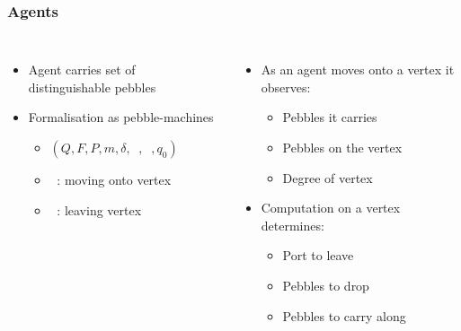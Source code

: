 \documentclass{beamer}
\DeclareMathOperator{\din}{\delta_{\mathit{in}}}
\DeclareMathOperator{\dout}{\delta_{\mathit{out}}}
\begin{document}
\begin{frame}
  \frametitle{Agents}
  \begin{columns}
    \begin{itemize}
      \item Agent carries set of distinguishable pebbles
      \item Formalisation as pebble-machines
        \begin{itemize}
          \item $(Q,F,P,m,\delta,\din,\dout,q_{0})$
          \item<2-> $\din$: moving onto vertex
          \item<7-> $\dout$: leaving vertex
        \end{itemize}
    \end{itemize}
    \begin{itemize}
      \item<3-> As an agent moves onto a vertex it observes:
        \begin{itemize}
          \item<4-> Pebbles it carries
          \item<5-> Pebbles on the vertex
          \item<6-> Degree of vertex
        \end{itemize}
      \item<8-> Computation on a vertex determines:
        \begin{itemize}
          \item<9-> Port to leave
          \item<10-> Pebbles to drop
          \item<11-> Pebbles to carry along
        \end{itemize}
    \end{itemize}
  \end{columns}
\end{frame}
\end{document}
